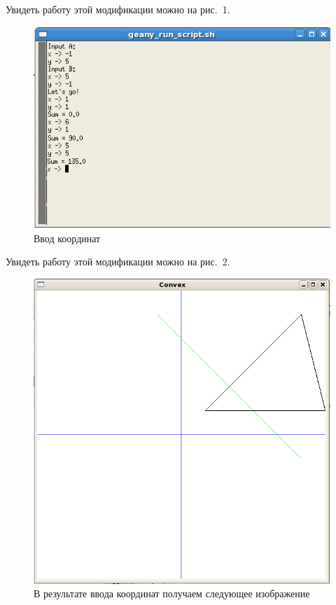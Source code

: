 Увидеть работу этой модификации можно на рис.~1.

\begin{figure}[ht!]
\begin{center}
\includegraphics[scale=0.6]{images/1}
\end{center}
\vspace*{-8mm}
\caption{Ввод координат}\label{fig:term_1}
\end{figure}

Увидеть работу этой модификации можно на рис.~2.

\begin{figure}[ht!]
\begin{center}
\includegraphics[scale=0.6]{images/2}
\end{center}
\vspace*{-8mm}
\caption{В результате ввода координат получаем следующее изображение}\label{fig:pic_1}
\end{figure}
